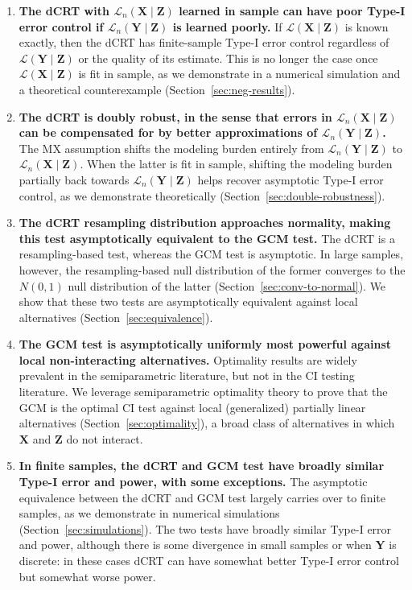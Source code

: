 \documentclass[aos]{imsart}
\theoremstyle{plain}
\theoremstyle{remark}
\newcommand{\prx}{\bm X}								%
\newcommand{\prz}{\bm Z}								%
\newcommand{\pry}{{\bm Y}}								%
\newcommand{\law}{\mathcal L}							%
\begin{document}
\begin{enumerate}
	\item \textbf{The dCRT with $\law_n(\prx \mid \prz)$ learned in sample can have poor Type-I error control if $\law_n(\pry \mid \prz)$ is learned poorly.} If $\law(\prx \mid \prz)$ is known exactly, then the dCRT has finite-sample Type-I error control regardless of $\law(\pry \mid \prz)$ or the quality of its estimate. This is no longer the case once $\law(\prx \mid \prz)$ is fit in sample, as we demonstrate in a numerical simulation and a theoretical counterexample (Section~\ref{sec:neg-results}).
	\item \textbf{The dCRT is doubly robust, in the sense that errors in $\law_n(\prx \mid \prz)$ can be compensated for by better approximations of $\law_n(\pry \mid \prz)$.} The MX assumption shifts the modeling burden entirely from $\law_n(\pry \mid \prz)$ to $\law_n(\prx \mid \prz)$. When the latter is fit in sample, shifting the modeling burden partially back towards $\law_n(\pry \mid \prz)$ helps recover asymptotic Type-I error control, as we demonstrate theoretically (Section~\ref{sec:double-robustness}).
	\item \textbf{The dCRT resampling distribution approaches normality, making this test asymptotically equivalent to the GCM test.} The dCRT is a resampling-based test, whereas the GCM test is asymptotic. In large samples, however, the resampling-based null distribution of the former converges to the $N(0,1)$ null distribution of the latter (Section~\ref{sec:conv-to-normal}). We show that these two tests are asymptotically equivalent against local alternatives (Section~\ref{sec:equivalence}).
	\item \textbf{The GCM test is asymptotically uniformly most powerful against local non-interacting alternatives.} Optimality results are widely prevalent in the semiparametric literature, but not in the CI testing literature. We leverage semiparametric optimality theory to prove that the GCM is the optimal CI test against  local (generalized) partially linear alternatives (Section~\ref{sec:optimality}), a broad class of alternatives in which $\prx$ and $\prz$ do not interact.
	\item \textbf{In finite samples, the dCRT and GCM test have broadly similar Type-I error and power, with some exceptions.} The asymptotic equivalence between the dCRT and GCM test largely carries over to finite samples, as we demonstrate in numerical simulations (Section~\ref{sec:simulations}). The two tests have broadly similar Type-I error and power, although there is some divergence in small samples or when $\pry$ is discrete: in these cases dCRT can have somewhat better Type-I error control but somewhat worse power. 

\end{enumerate}
\end{document}
